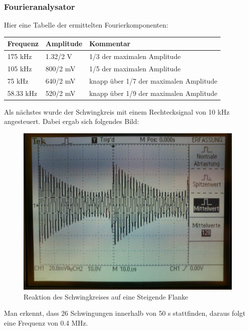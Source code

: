 \subsubsection{Fourieranalysator}
Hier eine Tabelle der ermittelten Fourierkomponenten:\\
\begin{tabular}{|l|l|l|}
	\hline
	Frequenz & Amplitude & Kommentar\\
	\hline
	\hline
	175 kHz & 1.32/2 V & 1/3 der maximalen Amplitude\\
	\hline
	105 kHz & 800/2 mV & 1/5 der maximalen Amplitude\\
	\hline
	75 kHz & 640/2 mV & knapp über 1/7 der maximalen Amplitude\\
	\hline
	58.33 kHz & 520/2 mV & knapp über 1/9 der maximalen Amplitude\\
	\hline
\end{tabular}

Als nächstes wurde der Schwingkreis mit einem Rechtecksignal von 10 kHz angesteuert. Dabei ergab sich folgendes Bild:
\begin{figure}[H]
	\centering
	\includegraphics[width=\linewidth]{versuch4/oszi/DSC_0411.JPG}
	\caption{Reaktion des Schwingkreises auf eine Steigende Flanke}
\end{figure}
Man erkennt, dass 26 Schwingungen innerhalb von 50 \mu s stattfinden, daraus folgt eine Frequenz von 0.4 MHz.

